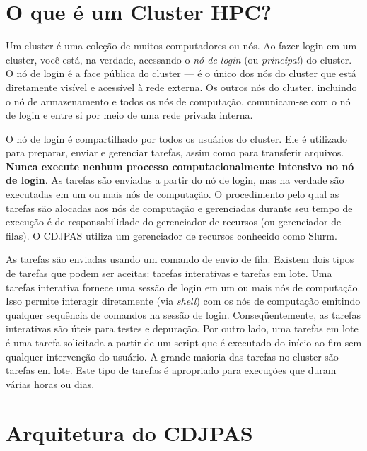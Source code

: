 \section{O que é um Cluster HPC?}
\label{sec:o-que-e-um-cluster-hpc}


Um cluster é uma coleção de muitos computadores ou nós. Ao fazer login em um cluster, você está, na verdade, acessando o \textit{nó de login} (ou \textit{principal}) do cluster. O nó de login é a face pública do cluster --- é o único dos nós do cluster que está diretamente visível e acessível à rede externa. Os outros nós do cluster, incluindo o nó de armazenamento e todos os nós de computação, comunicam-se com o nó de login e entre si por meio de uma rede privada interna.

O nó de login é compartilhado por todos os usuários do cluster. Ele é utilizado para preparar, enviar e gerenciar tarefas, assim como para transferir arquivos. \textbf{Nunca execute nenhum processo computacionalmente intensivo no nó de login}. As tarefas são enviadas a partir do nó de login, mas na verdade são executadas em um ou mais nós de computação. O procedimento pelo qual as tarefas são alocadas aos nós de computação e gerenciadas durante seu tempo de execução é de responsabilidade do gerenciador de recursos (ou gerenciador de filas). O CDJPAS utiliza um gerenciador de recursos conhecido como Slurm.

As tarefas são enviadas usando um comando de envio de fila. Existem dois tipos de tarefas que podem ser aceitas: tarefas interativas e tarefas em lote. Uma tarefas interativa fornece uma sessão de login em um ou mais nós de computação. Isso permite interagir diretamente (via \textit{shell}) com os nós de computação emitindo qualquer sequência de comandos na sessão de login. Conseqüentemente, as tarefas interativas são úteis para testes e depuração. Por outro lado, uma tarefas em lote é uma tarefa solicitada a partir de um script que é executado do início ao fim sem qualquer intervenção do usuário. A grande maioria das tarefas no cluster são tarefas em lote. Este tipo de tarefas é apropriado para execuções que duram várias horas ou dias.



\section{Arquitetura do CDJPAS}
\label{sec:arquitetura-do-cdjpas}


